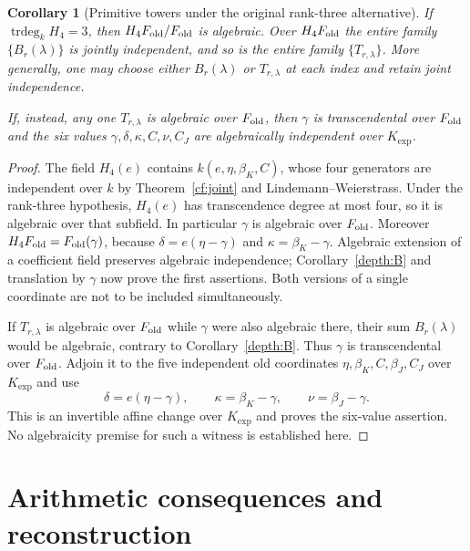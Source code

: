 \documentclass[11pt]{article}
\newtheorem{corollary}[theorem]{Corollary}
\theoremstyle{definition}
\theoremstyle{remark}
\newcommand{\trdeg}{\operatorname{trdeg}}
\newcommand{\Kexp}{K_{\mathrm{exp}}}
\begin{document}
\begin{corollary}[Primitive towers under the original rank-three alternative]
\label{depth:conditional}
If $\trdeg_kH_4=3$, then $H_4F_{\rm old}/F_{\rm old}$ is
algebraic.  Over $H_4F_{\rm old}$ the entire family
$\{B_r(\lambda)\}$ is jointly independent, and so is the entire
family $\{T_{r,\lambda}\}$.  More generally, one may choose
either $B_r(\lambda)$ or $T_{r,\lambda}$ at each index and retain
joint independence.

If, instead, any one $T_{r,\lambda}$ is algebraic over
$F_{\rm old}$, then $\gamma$ is transcendental over
$F_{\rm old}$ and the six values
$\gamma,\delta,\kappa,C,\nu,C_J$ are algebraically independent
over $\Kexp$.
\end{corollary}
\begin{proof}
The field $H_4(e)$ contains
$k(e,\eta,\beta_K,C)$, whose four generators are independent
over $k$ by Theorem~\ref{cf:joint} and Lindemann--Weierstrass.
Under the rank-three hypothesis, $H_4(e)$ has transcendence
degree at most four, so it is algebraic over that subfield.
In particular $\gamma$ is algebraic over $F_{\rm old}$.
Moreover $H_4F_{\rm old}=F_{\rm old}(\gamma)$, because
$\delta=e(\eta-\gamma)$ and $\kappa=\beta_K-\gamma$.
Algebraic extension of a coefficient field preserves algebraic
independence; Corollary~\ref{depth:B} and translation by
$\gamma$ now prove the first assertions.  Both versions of a
single coordinate are not to be included simultaneously.

If $T_{r,\lambda}$ is algebraic over $F_{\rm old}$ while
$\gamma$ were also algebraic there, their sum $B_r(\lambda)$
would be algebraic, contrary to Corollary~\ref{depth:B}.
Thus $\gamma$ is transcendental over $F_{\rm old}$.
Adjoin it to the five independent old coordinates
$\eta,\beta_K,C,\beta_J,C_J$ over $\Kexp$ and use
\[
 \delta=e(\eta-\gamma),\qquad
 \kappa=\beta_K-\gamma,\qquad
 \nu=\beta_J-\gamma.
\]
This is an invertible affine change over $\Kexp$ and proves
the six-value assertion.  No algebraicity premise for such a
witness is established here.
\end{proof}

\part{Arithmetic consequences and reconstruction}
\end{document}
